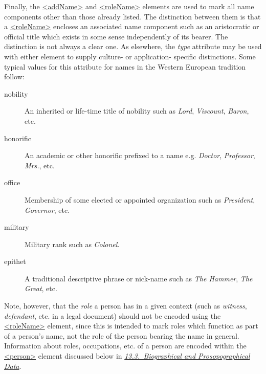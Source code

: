 Finally, the \hyperref[TEI.addName]{<addName>} and \hyperref[TEI.roleName]{<roleName>} elements are used to mark all name components other than those already listed. The distinction between them is that a \hyperref[TEI.roleName]{<roleName>} encloses an associated name component such as an aristocratic or official title which exists in some sense independently of its bearer. The distinction is not always a clear one. As elsewhere, the {\itshape type} attribute may be used with either element to supply culture- or application- specific distinctions. Some typical values for this attribute for names in the Western European tradition follow: \begin{description}

\item[{nobility}]An inherited or life-time title of nobility such as \textit{Lord}, \textit{Viscount}, \textit{Baron}, etc.
\item[{honorific}]An academic or other honorific prefixed to a name e.g. \textit{Doctor}, \textit{Professor}, \textit{Mrs.}, etc.
\item[{office}]Membership of some elected or appointed organization such as \textit{President}, \textit{Governor}, etc.
\item[{military}]Military rank such as \textit{Colonel}.
\item[{epithet}]A traditional descriptive phrase or nick-name such as \textit{The Hammer}, \textit{The Great}, etc.
\end{description}  Note, however, that the \textit{role} a person has in a given context (such as \textit{witness}, \textit{defendant}, etc. in a legal document) should not be encoded using the \hyperref[TEI.roleName]{<roleName>} element, since this is intended to mark roles which function as part of a person's name, not the role of the person bearing the name in general. Information about roles, occupations, etc. of a person are encoded within the \hyperref[TEI.person]{<person>} element discussed below in \textit{\hyperref[NDPERS]{13.3.\ Biographical and Prosopographical Data}}.\par
